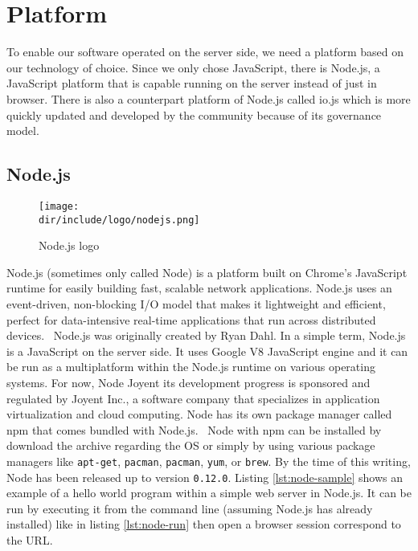 \section{Platform}
\label{sec:platform}

To enable our software operated on the server side, we need a platform based on our technology of choice.
Since we only chose JavaScript, there is Node.js, a JavaScript platform that is capable running on the server instead of just in browser.
There is also a counterpart platform of Node.js called io.js which is more quickly updated and developed by the community because of its governance model.

\subsection{Node.js}

\begin{wrapfigure}{r}{0.5\textwidth}
  \vspace{-20pt}
  \begin{center}
    \texttt{[image: \\dir/include/logo/nodejs.png]}
  \end{center}
  \vspace{-20pt}
  \caption{Node.js logo}
  \label{fig:nodejs-logo}
  \vspace{-10pt}
\end{wrapfigure}

Node.js\textsuperscript{\textregistered} (sometimes only called Node) is
a platform built on Chrome's JavaScript runtime for easily building fast, scalable network applications.
Node.js uses an event-driven, non-blocking I/O model that makes it lightweight and efficient, perfect for data-intensive real-time applications that run across distributed devices.~\autocite{Joyent:2015:Node}
Node.js was originally created by Ryan Dahl.
In a simple term, Node.js is a JavaScript on the server side.
It uses Google V8 JavaScript engine and it can be run as a multiplatform within the Node.js runtime on various operating systems.
For now, Node Joyent its development progress is sponsored and regulated by Joyent Inc., a software company that specializes in application virtualization and cloud computing.
Node has its own package manager called \ac{npm} that comes bundled with Node.js.~\autocite{Vincent:2014:npm}
Node with npm can be installed by download the archive regarding the \ac{OS} or simply by using various package managers like \verb|apt-get|, \verb|pacman|, \verb|pacman|, \verb|yum|, or \verb|brew|.
By the time of this writing, Node has been released up to version \verb|0.12.0|.
Listing \autoref{lst:node-sample} shows an example of a hello world program within a simple web server in Node.js.
It can be run by executing it from the command line (assuming Node.js has already installed) like in listing \autoref{lst:node-run} then open a browser session correspond to the \ac{URL}.


